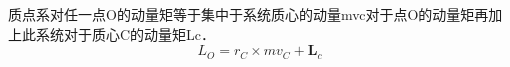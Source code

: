 质点系对任一点O的动量矩等于集中于系统质心的动量mvc对于点O的动量矩再加上此系统对于质心C的动量矩Lc．
\begin{equation}
L_O=r_C\times mv_C+ \mathbf{L}_c
\end{equation}